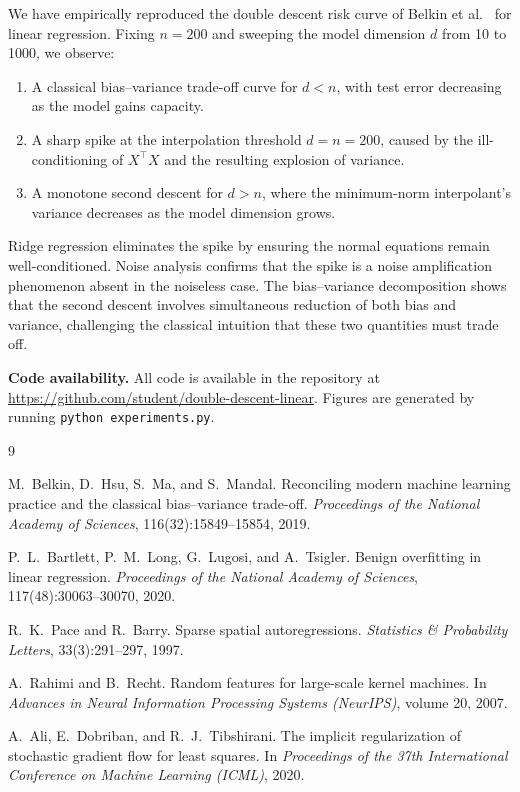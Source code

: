 \documentclass[11pt,a4paper]{article}
\begin{document}
We have empirically reproduced the double descent risk curve of Belkin et al.\ \cite{belkin2019reconciling}
for linear regression.
Fixing $n = 200$ and sweeping the model dimension $d$ from 10 to 1000, we observe:

\begin{enumerate}
  \item A classical bias--variance trade-off curve for $d < n$, with test error decreasing as
        the model gains capacity.
  \item A sharp spike at the interpolation threshold $d = n = 200$, caused by the ill-conditioning
        of $X^\top X$ and the resulting explosion of variance.
  \item A monotone second descent for $d > n$, where the minimum-norm interpolant's variance
        decreases as the model dimension grows.
\end{enumerate}

Ridge regression eliminates the spike by ensuring the normal equations remain well-conditioned.
Noise analysis confirms that the spike is a noise amplification phenomenon absent in the
noiseless case.
The bias--variance decomposition shows that the second descent involves simultaneous reduction
of both bias and variance, challenging the classical intuition that these two quantities must
trade off.

\bigskip
\noindent
\textbf{Code availability.}
All code is available in the repository at \url{https://github.com/student/double-descent-linear}.
Figures are generated by running \texttt{python experiments.py}.

\begin{thebibliography}{9}

M.~Belkin, D.~Hsu, S.~Ma, and S.~Mandal.
\newblock Reconciling modern machine learning practice and the classical bias--variance trade-off.
\newblock \emph{Proceedings of the National Academy of Sciences}, 116(32):15849--15854, 2019.

P.~L.~Bartlett, P.~M.~Long, G.~Lugosi, and A.~Tsigler.
\newblock Benign overfitting in linear regression.
\newblock \emph{Proceedings of the National Academy of Sciences}, 117(48):30063--30070, 2020.

R.~K.~Pace and R.~Barry.
\newblock Sparse spatial autoregressions.
\newblock \emph{Statistics \& Probability Letters}, 33(3):291--297, 1997.

A.~Rahimi and B.~Recht.
\newblock Random features for large-scale kernel machines.
\newblock In \emph{Advances in Neural Information Processing Systems (NeurIPS)}, volume 20, 2007.

A.~Ali, E.~Dobriban, and R.~J.~Tibshirani.
\newblock The implicit regularization of stochastic gradient flow for least squares.
\newblock In \emph{Proceedings of the 37th International Conference on Machine Learning (ICML)}, 2020.

\end{thebibliography}
\end{document}
